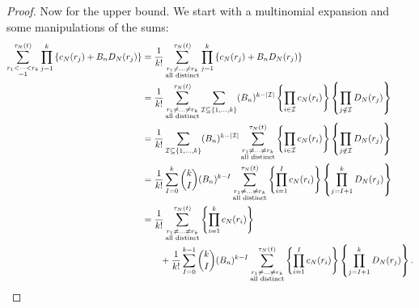 \documentclass{article}
\newcommand{\1}[1]{\mathbbm{1}_{#1}}
\begin{document}
\begin{proof}
Now for the upper bound. We start with a multinomial expansion and some manipulations of the sums:
\begin{align}
\sum_{\substack{r_1<\dots<r_k \\ =1}}^{\tau_N(t)}\prod_{j=1}^k 
\left\{ c_N(r_j) + B_n D_N(r_j) \right\}
&= \frac{1}{k!} \sum_{\substack{r_1\neq\dots\neq r_k \\\text{all distinct}}}^{\tau_N(t)}
\prod_{j=1}^k 
\left\{ c_N(r_j) + B_n D_N(r_j) \right\} \notag\\
&= \frac{1}{k!} \sum_{\substack{r_1\neq\dots\neq r_k \\\text{all distinct}}}^{\tau_N(t)} 
\sum_{\mathcal{I}\subseteq \{1,\dots ,k\}}  
( B_n )^{k-|\mathcal{I}|}
\left\{ \prod_{i\in\mathcal{I}} c_N(r_i) \right\} \left\{ \prod_{j\notin \mathcal{I}} D_N(r_j) \right\} \notag\\
&= \frac{1}{k!} 
\sum_{\mathcal{I}\subseteq \{1,\dots ,k\}}  
( B_n )^{k-|\mathcal{I}|}
\sum_{\substack{r_1\neq\dots\neq r_k \\\text{all distinct}}}^{\tau_N(t)}
\left\{ \prod_{i\in\mathcal{I}} c_N(r_i) \right\} \left\{ \prod_{j\notin \mathcal{I}} D_N(r_j) \right\} \notag\\
&= \frac{1}{k!}
\sum_{I=0}^k  \binom{k}{I}
( B_n )^{k-I}
\sum_{\substack{r_1\neq\dots\neq r_k \\\text{all distinct}}}^{\tau_N(t)} 
\left\{ \prod_{i=1}^{I} c_N(r_i) \right\} \left\{ \prod_{j=I+1}^k D_N(r_j) \right\} \notag\\
&= \frac{1}{k!} \sum_{\substack{r_1\neq\dots\neq r_k \\\text{all distinct}}}^{\tau_N(t)} 
\left\{ \prod_{i=1}^{k} c_N(r_i) \right\} \notag\\
&\qquad + \frac{1}{k!}
\sum_{I=0}^{k-1}  \binom{k}{I}
( B_n )^{k-I}
\sum_{\substack{r_1\neq\dots\neq r_k \\\text{all distinct}}}^{\tau_N(t)} 
\left\{ \prod_{i=1}^{I} c_N(r_i) \right\} \left\{ \prod_{j=I+1}^k D_N(r_j) \right\} .\label{eq:7}
\end{align}

\end{proof}
\end{document}
